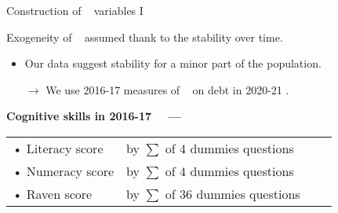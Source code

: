 \documentclass[aspectratio=169]{beamer}
\begin{document}



\begin{frame}{Construction of \PTCS~ variables I}

\begin{brickbox}
Exogeneity of \PTCS~ assumed thank to the stability over time.
\begin{itemize}
\item Our data suggest stability for a minor part of the population.
\item[$\rightarrow$] We use 2016-17 measures of \PTCS~ on debt in 2020-21 \citep{Anger2017a}.
\end{itemize}
\end{brickbox}

\vspace*{0.5em}

\textbf{Cognitive skills in 2016-17 ~~---}
\vspace*{0.2em}

\begin{tabular}{llll}
• Literacy score 	& by $\sum$ of 4 dummies questions \\
• Numeracy score 	& by $\sum$ of 4 dummies questions \\
• Raven score 	& by $\sum$ of 36 dummies questions	\\
\end{tabular}


\end{frame}
\end{document}
